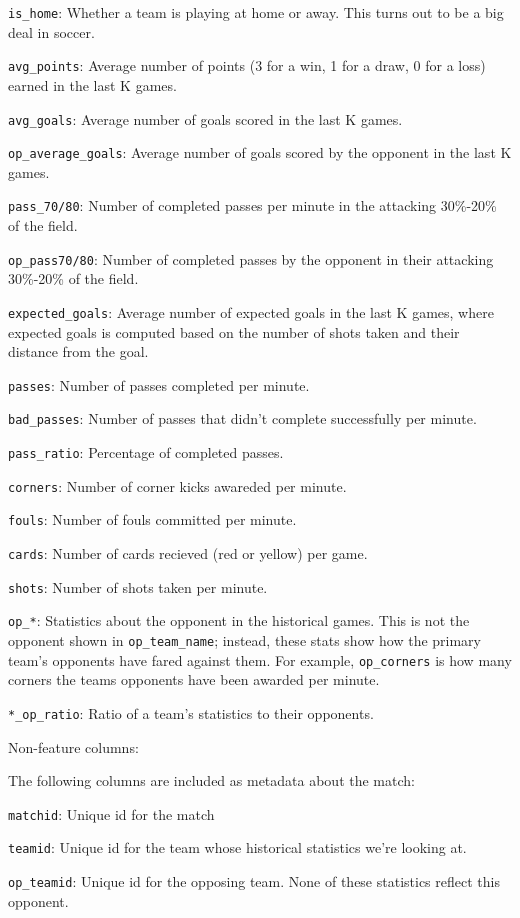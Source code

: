 \documentclass[12pt,fleqn]{article}\usepackage{../common}
\begin{document}
\verb!is_home!: Whether a team is playing at home or away. This turns out
to be a big deal in soccer.

\verb!avg_points!: Average number of points (3 for a win, 1 for a draw, 0
for a loss) earned in the last K games.

\verb!avg_goals!: Average number of goals scored in the last K games.

\verb!op_average_goals!: Average number of goals scored by the opponent in the last K games.

\verb!pass_70/80!: Number of completed passes per minute in the attacking
30\%-20\% of the field.

\verb!op_pass70/80!: Number of completed passes by the opponent in their
attacking 30\%-20\% of the field.

\verb!expected_goals!: Average number of expected goals in the last K
games, where expected goals is computed based on the number of shots taken
and their distance from the goal.

\verb!passes!: Number of passes completed per minute.

\verb!bad_passes!: Number of passes that didn't complete successfully per
minute.

\verb!pass_ratio!: Percentage of completed passes.

\verb!corners!: Number of corner kicks awareded per minute.

\verb!fouls!: Number of fouls committed per minute.

\verb!cards!: Number of cards recieved (red or yellow) per game.

\verb!shots!: Number of shots taken per minute.

\verb!op_*!: Statistics about the opponent in the historical games. This is
not the opponent shown in \verb!op_team_name!; instead, these stats show
how the primary team's opponents have fared against them. For example,
\verb!op_corners! is how many corners the teams opponents have been awarded
per minute.

\verb!*_op_ratio!: Ratio of a team's statistics to their opponents.

Non-feature columns:

The following columns are included as metadata about the match:

\verb!matchid!: Unique id for the match

\verb!teamid!: Unique id for the team whose historical statistics we're looking at.

\verb!op_teamid!: Unique id for the opposing team. None of these statistics
reflect this opponent.
\end{document}
